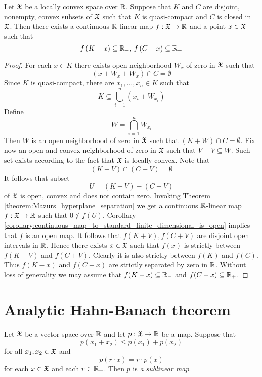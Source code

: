 \begin{theorem}\label{theorem:separation_in_locally_convex_spaces}
Let ${\mathfrak X}$ be a locally convex space over ${\mathbb R}$. Suppose that $K$ and $C$ are disjoint, nonempty, convex subsets of ${\mathfrak X}$ such that $K$ is quasi-compact and $C$ is closed in ${\mathfrak X}$. Then there exists a continuous ${\mathbb R}$-linear map $f:{\mathfrak X}\rightarrow {\mathbb R}$ and a point $x \in {\mathfrak X}$ such that
$$f\left(K - x\right) \subseteq {\mathbb R}_-,\,f\left(C - x\right)\subseteq {\mathbb R}_+$$
\end{theorem}
\begin{proof}
For each $x \in K$ there exists open neighborhood $W_x$ of zero in ${\mathfrak X}$ such that 
$$\left(x + W_x + W_x\right)\cap C = \emptyset$$ 
Since $K$ is quasi-compact, there are $x_1,...,x_n\in K$ such that 
$$K \subseteq \bigcup_{i=1}^n\left(x_i + W_{x_i}\right)$$
Define
$$W = \bigcap_{i=1}^nW_{x_i}$$
Then $W$ is an open neighborhood of zero in ${\mathfrak X}$ such that $\left(K + W\right)\cap C = \emptyset$. Fix now an open and convex neighborhood of zero in ${\mathfrak X}$ such that $V - V \subseteq W$. Such set exists according to the fact that ${\mathfrak X}$ is locally convex. Note that 
$$\left(K + V\right)\cap \left(C + V\right) = \emptyset$$
It follows that subset 
$$U = \left(K + V\right) - \left(C + V\right)$$
of ${\mathfrak X}$ is open, convex and does not contain zero. Invoking Theorem \ref{theorem:Mazurs_hyperplane_separation} we get a continuous ${\mathbb R}$-linear map $f:{\mathfrak X} \rightarrow {\mathbb R}$ such that $0 \not \in f\left(U\right)$. Corollary \ref{corollary:continuous_map_to_standard_finite_dimensional_is_open} implies that $f$ is an open map. It follows that $f\left(K + V\right),f\left(C + V\right)$ are disjoint open intervals in ${\mathbb R}$. Hence there exists $x \in {\mathfrak X}$ such that $f(x)$ is strictly between $f\left(K + V\right)$ and $f\left(C + V\right)$. Clearly it is also strictly between $f(K)$ and $f(C)$. Thus $f(K - x)$ and $f(C - x)$ are strictly separated by zero in ${\mathbb R}$. Without loss of generality we may assume that $f(K - x) \subseteq {\mathbb R}_-$ and $f(C - x)\subseteq {\mathbb R}_+$.
\end{proof}

\section{Analytic Hahn-Banach theorem}

\begin{definition}
Let ${\mathfrak X}$ be a vector space over ${\mathbb R}$ and let $p:{\mathfrak X}\rightarrow {\mathbb R}$ be a map. Suppose that
$$p(x_1 + x_2)\leq p(x_1) + p(x_2)$$
for all $x_1,x_2\in {\mathfrak X}$ and 
$$p(r\cdot x) = r\cdot p(x)$$
for each $x\in {\mathfrak X}$ and each $r\in {\mathbb R}_+$. Then $p$ is \textit{a sublinear map}.
\end{definition}

